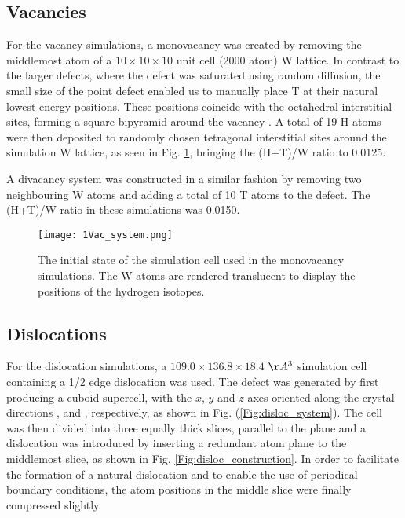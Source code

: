 \subsection{Vacancies}
For the vacancy simulations, a monovacancy was created by removing the middlemost atom of a $10\times 10 \times 10$ unit cell (2000 atom) W lattice.  
In contrast to the larger defects, where the defect was saturated using random diffusion, the small size of the point defect enabled us to manually place T at their natural lowest energy positions.
These positions coincide with the octahedral interstitial sites, forming a square bipyramid around the vacancy \cite{heinolaTungstenDFT}.
A total of 19 H atoms were then deposited to randomly chosen tetragonal interstitial sites around the simulation W lattice, as seen in Fig. \ref{Fig:monovac_system}, bringing the (H+T)/W ratio to 0.0125. 

A divacancy system was constructed in a similar fashion by removing two neighbouring W atoms and adding a total of 10 T atoms to the defect.
The (H+T)/W ratio in these simulations was 0.0150.

\begin{figure}[!ht]
\center
\texttt{[image: 1Vac\_system.png]}
\caption{The initial state of the simulation cell used in the monovacancy simulations. 
The W atoms are rendered translucent to display the positions of the hydrogen isotopes.}
\label{Fig:monovac_system}
\end{figure}

\subsection{Dislocations}
For the dislocation simulations, a  $109.0 \times 136.8 \times 18.4$ $\AA^3$ simulation cell containing a 1/2\hkl[1 1 1] edge dislocation was used. 
The defect was generated by first producing a cuboid supercell, with the $x$, $y$ and $z$ axes oriented along the crystal directions \hkl[1 1 1], \hkl[1 1 -2] and \hkl[-1 1 0], respectively, as shown in Fig. (\ref{Fig:disloc_system}). 
The cell was then divided into three equally thick slices, parallel to the  plane and a dislocation was introduced by inserting a redundant  atom plane to the middlemost slice, as shown in Fig. \ref{Fig:disloc_construction}. 
In order to facilitate the formation of a natural dislocation and to enable the use of periodical boundary conditions, the atom positions in the middle slice were finally compressed slightly.

